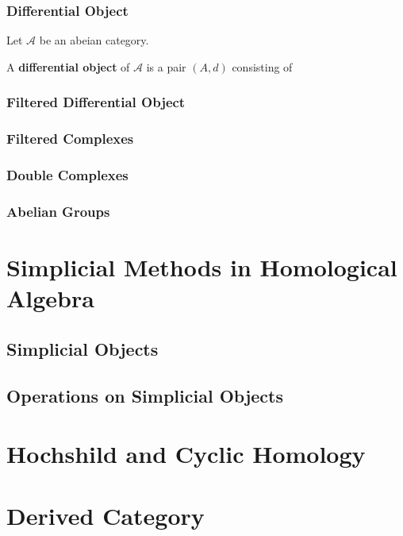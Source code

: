 \documentclass[Total.tex]{subfiles}
\begin{document}
			\subsection{Differential Object}
			\begin{Def}
				Let $\mathcal{A}$ be an abeian category.
				
				A \textbf{differential object} of $\mathcal{A}$ is a pair $(A,d)$ consisting of
			\end{Def}
			\subsection{Filtered Differential Object}
			\subsection{Filtered Complexes}
			\subsection{Double Complexes}
			\subsection{Abelian Groups}
		
	\chapter{Simplicial Methods in Homological Algebra}
		\section{Simplicial Objects}
		\section{Operations on Simplicial Objects}
	\chapter{Hochshild and Cyclic Homology}
	\chapter{Derived Category}
\end{document}
